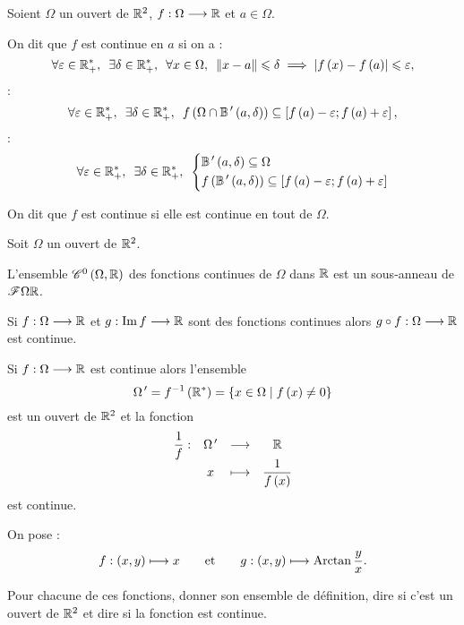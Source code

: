 \begin{defi}
Soient \(\Omega\) un ouvert de \(\mathbb{R}^2\), \(f:\Omega\longrightarrow\mathbb{R}\) et \(a\in\Omega\).

On dit que \(f\) est continue en \(a\) si on a : \[\quantifs{\forall\epsilon\in\Rps;\exists\delta\in\Rps;\forall x\in\Omega}\norme{x-a}\leq\delta\imp\abs{f\paren{x}-f\paren{a}}\leq\epsilon,\] \cad : \[\quantifs{\forall\epsilon\in\Rps;\exists\delta\in\Rps}f\paren{\Omega\inter\boulef{a}{\delta}}\subset\intervii{f\paren{a}-\epsilon}{f\paren{a}+\epsilon},\] \cad : \[\quantifs{\forall\epsilon\in\Rps;\exists\delta\in\Rps}\begin{dcases}
\boulef{a}{\delta}\subset\Omega \\
f\paren{\boulef{a}{\delta}}\subset\intervii{f\paren{a}-\epsilon}{f\paren{a}+\epsilon}
\end{dcases}\]

On dit que \(f\) est continue si elle est continue en tout de \(\Omega\).
\end{defi}

\begin{prop}
Soit \(\Omega\) un ouvert de \(\mathbb{R}^2\).

L'ensemble \(\mathscr{C}^{0}\left(\Omega,\mathbb{R}\right)\) des fonctions continues de \(\Omega\) dans \(\mathbb{R}\) est un sous-anneau de \(\mathscr{F}{\Omega}{\mathbb{R}}\).

Si \(f:\Omega\longrightarrow\mathbb{R}\) et \(g:\operatorname{Im} f\longrightarrow\mathbb{R}\) sont des fonctions continues alors \(g\circ f:\Omega\longrightarrow\mathbb{R}\) est continue.

Si \(f:\Omega\longrightarrow\mathbb{R}\) est continue alors l'ensemble \[\Omega^{\,\prime}=f^{-1}\left(\mathbb{R}^*\right)=\left\lbrace x\in\Omega\;\middle|\; f\left(x\right)\not=0\right\rbrace\] est un ouvert de \(\mathbb{R}^2\) et la fonction \[\begin{array}[t]{cccc}\dfrac{1}{f} : & \Omega^{\,\prime} & \longrightarrow & \mathbb{R} \\ & x & \longmapsto & \dfrac{1}{f\left(x\right)}\end{array}\] est continue.
\end{prop}

\begin{dem}
\end{dem}

\begin{exoex}
On pose : \[f:\left(x,y\right)\longmapsto x\qquad\text{et}\qquad g:\left(x,y\right)\longmapsto\operatorname{Arctan}\dfrac{y}{x}.\]

Pour chacune de ces fonctions, donner son ensemble de définition, dire si c'est un ouvert de \(\mathbb{R}^2\) et dire si la fonction est continue.
\end{exoex}


